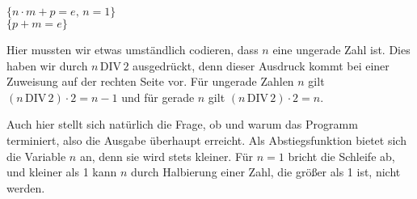 \begin{algorithm}
	\vspace{\baselineskip}
	
	\HiLi $\{n \cdot m + p = e, \, n = 1\}$ \\
	\HiLi $\{p + m = e\}$ \\ 
	
	\vspace{\baselineskip}
	
	
	\vspace{\baselineskip}
	
\end{algorithm}

\clearpage %

Hier mussten wir etwas umständlich codieren, dass $n$ eine ungerade Zahl ist. Dies haben wir durch $n \, \text{DIV} \, 2$ ausgedrückt, denn dieser Ausdruck kommt bei einer Zuweisung auf der rechten Seite vor. Für ungerade Zahlen $n$ gilt $(n \, \text{DIV} \, 2) \cdot 2 = n-1$ und für gerade $n$ gilt $(n \, \text{DIV} \, 2) \cdot 2 = n$.

Auch hier stellt sich natürlich die Frage, ob und warum das Programm terminiert, also die Ausgabe überhaupt erreicht. Als Abstiegsfunktion bietet sich die Variable $n$ an, denn sie wird stets kleiner. Für $n=1$ bricht die Schleife ab, und kleiner als 1 kann $n$ durch Halbierung einer Zahl, die größer als 1 ist, nicht werden.